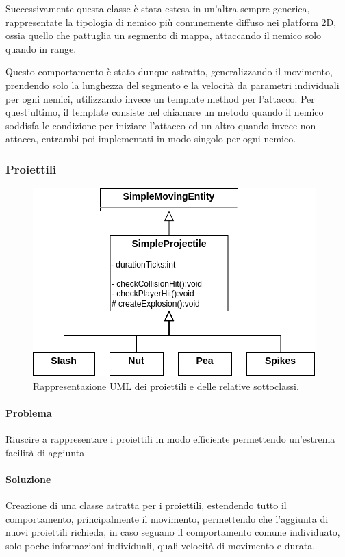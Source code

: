 \documentclass[a4paper,12pt]{report}
\begin{document}
Successivamente questa classe è stata estesa in un’altra sempre generica, rappresentate la tipologia di nemico più comunemente diffuso nei platform 2D, ossia quello che pattuglia un segmento di mappa, attaccando il nemico solo quando in range. 

Questo comportamento è stato dunque astratto, generalizzando il movimento, prendendo solo la lunghezza del segmento e la velocità da parametri individuali per ogni nemici, utilizzando invece un template method per l’attacco. Per quest’ultimo, il template consiste nel chiamare un metodo quando il nemico soddisfa le condizione per iniziare l’attacco ed un altro quando invece non attacca, entrambi poi implementati in modo singolo per ogni nemico.

\subsubsection{Proiettili}

\begin{figure}[H]
\centering{}
\includegraphics[scale=0.6] {img/projectiles.png}
\caption{Rappresentazione UML dei proiettili e delle relative sottoclassi.}
\label{img:projectiles}
\end{figure}

\paragraph{Problema} Riuscire a rappresentare i proiettili in modo efficiente permettendo un’estrema facilità di aggiunta

\paragraph{Soluzione} Creazione di una classe astratta per i proiettili, estendendo tutto il comportamento, principalmente il movimento, permettendo che l’aggiunta di nuovi proiettili richieda, in caso seguano il comportamento comune individuato, solo poche informazioni individuali, quali velocità di movimento e durata.
\end{document}
